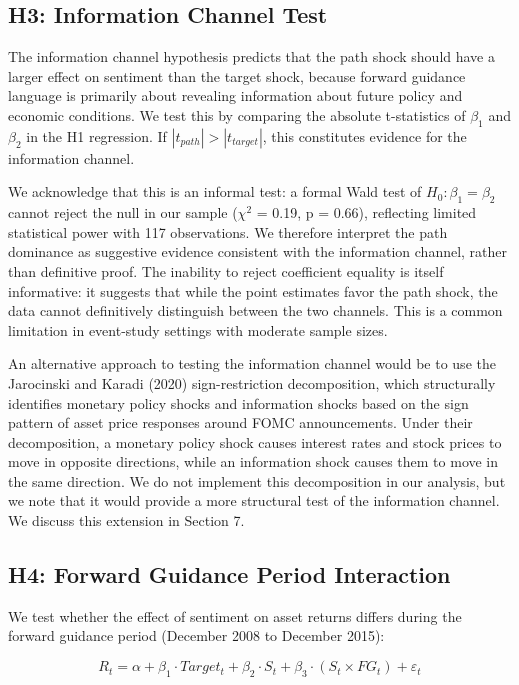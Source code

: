 \subsection{H3: Information Channel Test}

The information channel hypothesis predicts that the path shock should have a larger effect on sentiment than the target shock, because forward guidance language is primarily about revealing information about future policy and economic conditions. We test this by comparing the absolute t-statistics of $\beta_1$ and $\beta_2$ in the H1 regression. If $|t_{path}| > |t_{target}|$, this constitutes evidence for the information channel.

We acknowledge that this is an informal test: a formal Wald test of $H_0: \beta_1 = \beta_2$ cannot reject the null in our sample ($\chi^2$ = 0.19, p = 0.66), reflecting limited statistical power with 117 observations. We therefore interpret the path dominance as suggestive evidence consistent with the information channel, rather than definitive proof. The inability to reject coefficient equality is itself informative: it suggests that while the point estimates favor the path shock, the data cannot definitively distinguish between the two channels. This is a common limitation in event-study settings with moderate sample sizes.

An alternative approach to testing the information channel would be to use the Jarocinski and Karadi (2020) sign-restriction decomposition, which structurally identifies monetary policy shocks and information shocks based on the sign pattern of asset price responses around FOMC announcements. Under their decomposition, a monetary policy shock causes interest rates and stock prices to move in opposite directions, while an information shock causes them to move in the same direction. We do not implement this decomposition in our analysis, but we note that it would provide a more structural test of the information channel. We discuss this extension in Section 7.

\subsection{H4: Forward Guidance Period Interaction}

We test whether the effect of sentiment on asset returns differs during the forward guidance period (December 2008 to December 2015):

\begin{equation*}
R_t = \alpha + \beta_1 \cdot Target_t + \beta_2 \cdot S_t + \beta_3 \cdot (S_t \times FG_t) + \varepsilon_t
\end{equation*}

